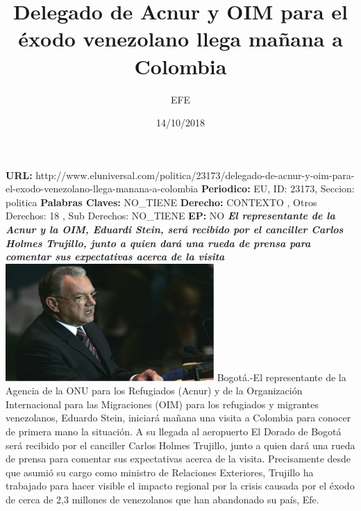 \documentclass{article}%
\title{\textbf{Delegado de Acnur y OIM para el éxodo venezolano llega mañana a Colombia}}%
\author{EFE}%
\date{14/10/2018}%
\begin{document}
%
\normalsize%
\maketitle%
\textbf{URL: }%
http://www.eluniversal.com/politica/23173/delegado{-}de{-}acnur{-}y{-}oim{-}para{-}el{-}exodo{-}venezolano{-}llega{-}manana{-}a{-}colombia\newline%
%
\textbf{Periodico: }%
EU, %
ID: %
23173, %
Seccion: %
politica\newline%
%
\textbf{Palabras Claves: }%
NO\_TIENE\newline%
%
\textbf{Derecho: }%
CONTEXTO%
, Otros Derechos: %
18%
, Sub Derechos: %
NO\_TIENE%
\newline%
%
\textbf{EP: }%
NO\newline%
\newline%
%
\textbf{\textit{El representante de la Acnur y la OIM, Eduardi Stein, será recibido por el canciller Carlos Holmes Trujillo, junto a quien dará una rueda de prensa para comentar sus expectativas acerca de la visita}}%
\newline%
\newline%
%
\includegraphics[width=300px]{76.jpg}%
\newline%
%
Bogotá.{-}El representante de la Agencia de la ONU para los Refugiados (Acnur) y de la Organización Internacional para las Migraciones (OIM) para los refugiados y migrantes venezolanos, Eduardo Stein, iniciará mañana una visita a Colombia para conocer de primera mano la situación.%
\newline%
%
A su llegada al aeropuerto El Dorado de Bogotá será recibido por el canciller Carlos Holmes Trujillo, junto a quien dará una rueda de prensa para comentar sus expectativas acerca de la visita.%
\newline%
%
Precisamente desde que asumió su cargo como ministro de Relaciones Exteriores, Trujillo ha trabajado para hacer visible el impacto regional por la crisis causada por el éxodo de cerca de 2,3 millones de venezolanos que han abandonado su país, Efe.%
\newline%
\end{document}
